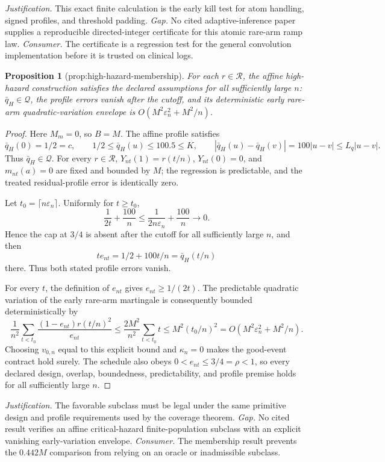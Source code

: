 \documentclass{article}
\newtheorem{proposition}{Proposition}
\begin{document}
\par\smallskip\noindent \textit{Justification.} This exact finite calculation is the early kill test for atom handling, signed profiles, and threshold padding. \textit{Gap.} No cited adaptive-inference paper supplies a reproducible directed-integer certificate for this atomic rare-arm ramp law. \textit{Consumer.} The certificate is a regression test for the general convolution implementation before it is trusted on clinical logs.

\begin{proposition}[prop:high-hazard-membership]\label{prop:high-hazard-membership}
For each \(r\in\mathcal R\), the affine high-hazard construction satisfies the declared assumptions for all sufficiently large \(n\): \(\bar q_H\in\mathcal Q\), the profile errors vanish after the cutoff, and its deterministic early rare-arm quadratic-variation envelope is \(O(M^2\varepsilon_n^2+M^2/n)\).
\end{proposition}
\begin{proof}
Here \(M_m=0\), so \(B=M\).  The affine profile satisfies
\[
 \bar q_H(0)=1/2=c,\qquad
 1/2\leq\bar q_H(u)\leq100.5\leq K,\qquad
 |\bar q_H(u)-\bar q_H(v)|=100|u-v|\leq L_q|u-v|.
\]
Thus \(\bar q_H\in\mathcal Q\).  For every \(r\in\mathcal R\),
\(Y_{nt}(1)=r(t/n)\), \(Y_{nt}(0)=0\), and \(m_{nt}(a)=0\) are fixed and bounded by \(M\); the regression is predictable, and the treated residual-profile error is identically zero.

Let \(t_0=\lceil n\varepsilon_n\rceil\).  Uniformly for \(t\geq t_0\),
\[
 \frac{1}{2t}+\frac{100}{n}
 \leq\frac{1}{2n\varepsilon_n}+\frac{100}{n}\longrightarrow0.
\]
Hence the cap at \(3/4\) is absent after the cutoff for all sufficiently large \(n\), and then
\[
 t e_{nt}=1/2+100t/n=\bar q_H(t/n)
\]
there.  Thus both stated profile errors vanish.

For every \(t\), the definition of \(e_{nt}\) gives
\(e_{nt}\geq1/(2t)\).  The predictable quadratic variation of the early rare-arm martingale is consequently bounded deterministically by
\[
 \frac1{n^2}\sum_{t<t_0}
 \frac{(1-e_{nt})r(t/n)^2}{e_{nt}}
 \leq\frac{2M^2}{n^2}\sum_{t<t_0}t
 \leq M^2(t_0/n)^2
 =O(M^2\varepsilon_n^2+M^2/n).
\]
Choosing \(v_{0,n}\) equal to this explicit bound and \(\kappa_n=0\) makes the good-event contract hold surely.  The schedule also obeys
\(0<e_{nt}\leq3/4=\rho<1\), so every declared design, overlap, boundedness, predictability, and profile premise holds for all sufficiently large \(n\).
\end{proof}
\par\smallskip\noindent \textit{Justification.} The favorable subclass must be legal under the same primitive design and profile requirements used by the coverage theorem. \textit{Gap.} No cited result verifies an affine critical-hazard finite-population subclass with an explicit vanishing early-variation envelope. \textit{Consumer.} The membership result prevents the \(0.442M\) comparison from relying on an oracle or inadmissible subclass.
\end{document}
